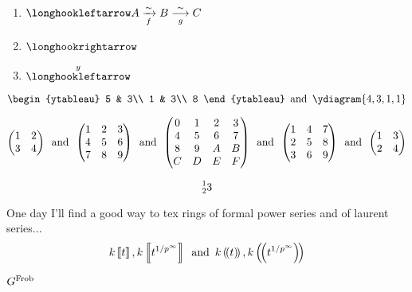 \documentclass{article}
\numberwithin{thm}{section}
\numberwithin{prob}{section}
\numberwithin{equation}{section}
\begin{document}
\begin{enumerate}
    \item  $\fintoo A\xiso fB\xisoo gC$
    \item  $\intoo$
    \item $\xfintoo{y}$
\end{enumerate}
$$\begin{ytableau}
    5 & 3\\
    1 & 3\\
    8
\end{ytableau}\tand\ydiagram{4,3,1,1}$$

$$\mat1234\tand\Mat123456789\tand\MAT0123456789ABCDEF\tand\Matt123456789\tand\matt1234$$

$$\prescript123$$

One day I'll find a good way to tex rings of formal power series and of laurent series...
$$k\dsq t,k\dsq{t^{1/p^\infty}}\tand k\dparens t,k\dparens{t^{1/p^\infty}}$$

$G^\Frob$
\end{document}
